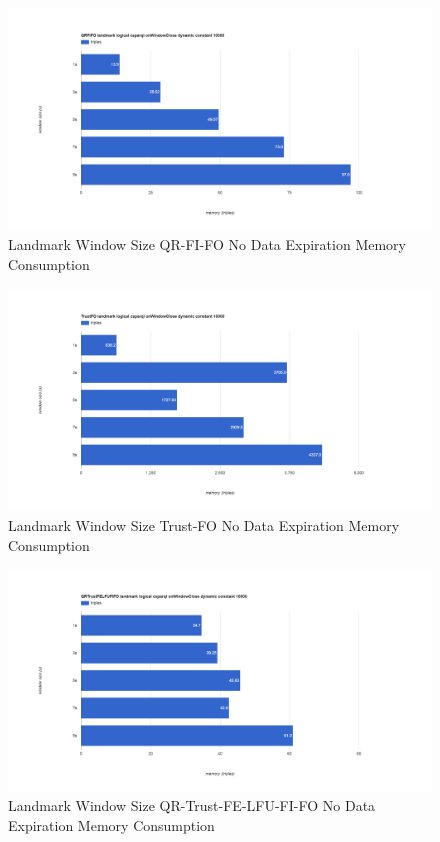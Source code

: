 \begin{figure}[!htbp]
    \centering
    \includegraphics[width=\textwidth]{img/app3-land-ws-qrfifo-no-m.png}
    \caption{Landmark Window Size QR-FI-FO No Data Expiration Memory Consumption}
\end{figure}
\begin{figure}[!htbp]
    \centering
    \includegraphics[width=\textwidth]{img/app3-land-ws-trustfo-no-m.png}
    \caption{Landmark Window Size Trust-FO No Data Expiration Memory Consumption}
\end{figure}
\begin{figure}[!htbp]
    \centering
    \includegraphics[width=\textwidth]{img/app3-land-ws-qrtrustfelfufifo-no-m.png}
    \caption{Landmark Window Size QR-Trust-FE-LFU-FI-FO No Data Expiration Memory Consumption}
\end{figure}


